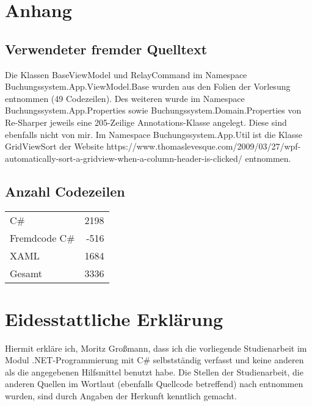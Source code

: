 \section{Anhang}

\subsection{Verwendeter fremder Quelltext}

Die Klassen BaseViewModel und RelayCommand im Namespace Buchungssystem.App.ViewModel.Base wurden aus den Folien der Vorlesung entnommen (49 Codezeilen).
Des weiteren wurde im Namespace Buchungssystem.App.Properties sowie Buchungssystem.Domain.Properties von Re-Sharper jeweils eine 205-Zeilige Annotations-Klasse angelegt. 
Diese sind ebenfalls nicht von mir. Im Namespace Buchungssystem.App.Util ist die Klasse GridViewSort der  Website https://www.thomaslevesque.com/2009/03/27/wpf-automatically-sort-a-gridview-when-a-column-header-is-clicked/ entnommen.

\subsection{Anzahl Codezeilen}

\begin{tabular} {lr}
    C\# & 2198 \\
    Fremdcode C\# & -516 \\
    XAML & 1684 \\
    Gesamt & 3336 \\
\end{tabular}

\section{Eidesstattliche Erklärung}

Hiermit erkläre ich, Moritz Großmann, dass ich die vorliegende Studienarbeit im Modul .NET-Programmierung mit C\# selbstständig verfasst und keine anderen als die angegebenen Hilfsmittel benutzt habe.
Die Stellen der Studienarbeit, die anderen Quellen im Wortlaut (ebenfalls Quellcode betreffend) nach entnommen wurden, sind durch Angaben der Herkunft kenntlich gemacht. 
